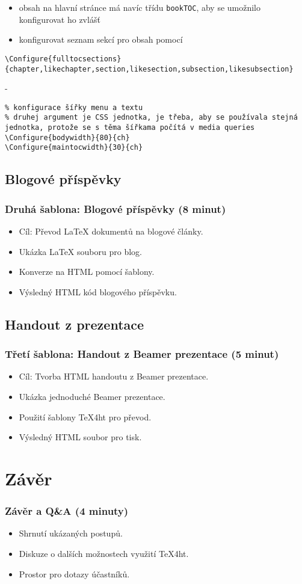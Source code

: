 \documentclass{beamer}
\begin{document}
\begin{frame}[fragile]
\begin{itemize}
  \item obsah na hlavní stránce má navíc třídu \verb|bookTOC|, aby se umožnilo konfigurovat ho zvlášť
  \item konfigurovat seznam sekcí pro obsah pomocí 
\end{itemize}
\begin{verbatim}
\Configure{fulltocsections}{chapter,likechapter,section,likesection,subsection,likesubsection}
\end{verbatim}
\end{frame}

- 

\begin{verbatim}
% konfigurace šířky menu a textu
% druhej argument je CSS jednotka, je třeba, aby se používala stejná jednotka, protože se s těma šířkama počítá v media queries
\Configure{bodywidth}{80}{ch}
\Configure{maintocwidth}{30}{ch}
\end{verbatim}


\subsection{Blogové příspěvky}
\begin{frame}
\frametitle{Druhá šablona: Blogové příspěvky (8 minut)}
\begin{itemize}
    \item Cíl: Převod LaTeX dokumentů na blogové články.
    \item Ukázka LaTeX souboru pro blog.
    \item Konverze na HTML pomocí šablony.
    \item Výsledný HTML kód blogového příspěvku.
\end{itemize}
\end{frame}

\subsection{Handout z prezentace}
\begin{frame}
\frametitle{Třetí šablona: Handout z Beamer prezentace (5 minut)}
\begin{itemize}
    \item Cíl: Tvorba HTML handoutu z Beamer prezentace.
    \item Ukázka jednoduché Beamer prezentace.
    \item Použití šablony TeX4ht pro převod.
    \item Výsledný HTML soubor pro tisk.
\end{itemize}
\end{frame}

\section{Závěr}

\begin{frame}
\frametitle{Závěr a Q\&A (4 minuty)}
\begin{itemize}
    \item Shrnutí ukázaných postupů.
    \item Diskuze o dalších možnostech využití TeX4ht.
    \item Prostor pro dotazy účastníků.
\end{itemize}
\end{frame}
\end{document}
